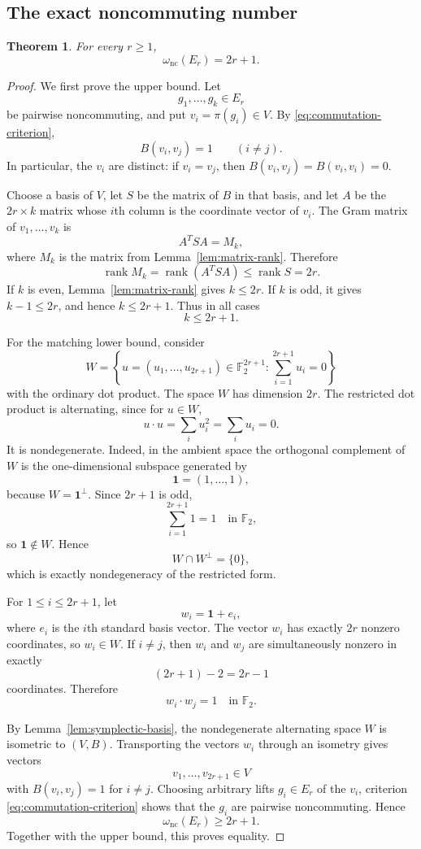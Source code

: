 \documentclass[11pt]{article}
\newtheorem{theorem}{Theorem}[section]
\theoremstyle{definition}
\newcommand{\F}{\mathbb{F}}
\newcommand{\nc}{\omega_{\mathrm{nc}}}
\newcommand{\rank}{\operatorname{rank}}
\begin{document}
\subsection{The exact noncommuting number}

\begin{theorem}\label{thm:Er-clique}
For every $r\ge1$,
\[
 \nc(E_r)=2r+1.
\]
\end{theorem}

\begin{proof}
We first prove the upper bound.  Let
\[
 g_1,\dots,g_k\in E_r
\]
be pairwise noncommuting, and put $v_i=\pi(g_i)\in V$.  By \eqref{eq:commutation-criterion},
\[
 B(v_i,v_j)=1
 \qquad(i\ne j).
\]
In particular, the $v_i$ are distinct: if $v_i=v_j$, then $B(v_i,v_j)=B(v_i,v_i)=0$.

Choose a basis of $V$, let $S$ be the matrix of $B$ in that basis, and let $A$ be the $2r\times k$ matrix whose $i$th column is the coordinate vector of $v_i$.  The Gram matrix of $v_1,\dots,v_k$ is
\[
 A^TSA=M_k,
\]
where $M_k$ is the matrix from Lemma~\ref{lem:matrix-rank}.  Therefore
\[
 \rank M_k=\rank(A^TSA)\le\rank S=2r.
\]
If $k$ is even, Lemma~\ref{lem:matrix-rank} gives $k\le2r$.  If $k$ is odd, it gives $k-1\le2r$, and hence $k\le2r+1$.  Thus in all cases
\[
 k\le2r+1.
\]

For the matching lower bound, consider
\[
 W=\left\{u=(u_1,\dots,u_{2r+1})\in\F_2^{2r+1}:
            \sum_{i=1}^{2r+1}u_i=0\right\}
\]
with the ordinary dot product.  The space $W$ has dimension $2r$.  The restricted dot product is alternating, since for $u\in W$,
\[
 u\cdot u=\sum_i u_i^2=\sum_i u_i=0.
\]
It is nondegenerate.  Indeed, in the ambient space the orthogonal complement of $W$ is the one-dimensional subspace generated by
\[
 \mathbf{1}=(1,\dots,1),
\]
because $W=\mathbf{1}^\perp$.  Since $2r+1$ is odd,
\[
 \sum_{i=1}^{2r+1}1=1\quad\text{in }\F_2,
\]
so $\mathbf{1}\notin W$.  Hence
\[
 W\cap W^\perp=\{0\},
\]
which is exactly nondegeneracy of the restricted form.

For $1\le i\le2r+1$, let
\[
 w_i=\mathbf{1}+e_i,
\]
where $e_i$ is the $i$th standard basis vector.  The vector $w_i$ has exactly $2r$ nonzero coordinates, so $w_i\in W$.  If $i\ne j$, then $w_i$ and $w_j$ are simultaneously nonzero in exactly
\[
 (2r+1)-2=2r-1
\]
coordinates.  Therefore
\[
 w_i\cdot w_j=1\quad\text{in }\F_2.
\]

By Lemma~\ref{lem:symplectic-basis}, the nondegenerate alternating space $W$ is isometric to $(V,B)$.  Transporting the vectors $w_i$ through an isometry gives vectors
\[
 v_1,\dots,v_{2r+1}\in V
\]
with $B(v_i,v_j)=1$ for $i\ne j$.  Choosing arbitrary lifts $g_i\in E_r$ of the $v_i$, criterion \eqref{eq:commutation-criterion} shows that the $g_i$ are pairwise noncommuting.  Hence
\[
 \nc(E_r)\ge2r+1.
\]
Together with the upper bound, this proves equality.
\end{proof}
\end{document}

